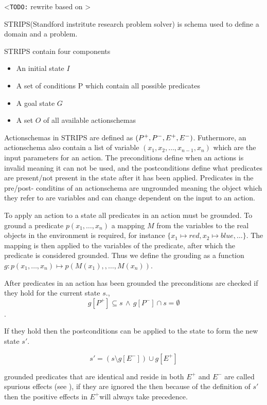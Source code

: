 \documentclass[Master.tex]{subfiles}
\begin{document}
<\texttt{TODO:} rewrite based on \cite{ghallab2004a}>

STRIPS(Standford instritute research problem solver) is schema used
to define a domain and a problem.

STRIPS contain four components

\begin{itemize}
    \item An initial state $I$
    \item A set of conditions P which contain all possible predicates
    \item A goal state $G$
    \item A set $O$ of all available actionschemas
\end{itemize}

Actionschemas in STRIPS are defined as $\text{\ensuremath{\left(P^{+},P^{-},E^{+},E^{-}\right)}}$.
Futhermore, an actionschema also contain a list of variable $(x_{1},x_{2},\dots,x_{n-1},x_{n})$
which are the input parameters for an action. The preconditions define
when an actions is invalid meaning it can not be used, and the postconditions
define what predicates are present/not present in the state after
it has been applied. Predicates in the pre/post- conditins of an actionschema
are ungrounded meaning the object which they refer to are variables
and can change dependent on the input to an action.

To apply an action to a state all predicates in an action must be
grounded. To ground a predicate $p(x_{1},\dots,x_{n})$ a mapping
$M$ from the variables to the real objects in the environment is
required, for instance $\{x_{1}\mapsto red,x_{2}\mapsto blue, \dots\}$.
The mapping is then applied to the variables of the predicate, after
which the predicate is considered grounded. Thus we define the grouding
as a function $g:p(x_{1},\dots,x_{n})\mapsto p\left(M\left(x_{1}\right),,\dots,M\left(x_{n}\right)\right)$.

After predicates in an action has been grounded the preconditions
are checked if they hold for the current state $s$., \\
\[
g\left[P^{+}\right]\subseteq s\,\land\, g\left[P^{-}\right]\cap s=\emptyset
\]
.

If they hold then the postconditions can be applied to the state to
form the new state $s'$.

\[
s'=\left(s\setminus g\left[E^{-}\right]\right)\cup g\left[E^{+}\right]
\]


grounded predicates that are identical and reside in both $E^{+}$
and $E^{-}$ are called spurious effects (see \cite{Russell}), if they are ignored the
then because of the definition of $s'$ then the positive effects
in $E^{+}$will always take precedence.
\end{document}

